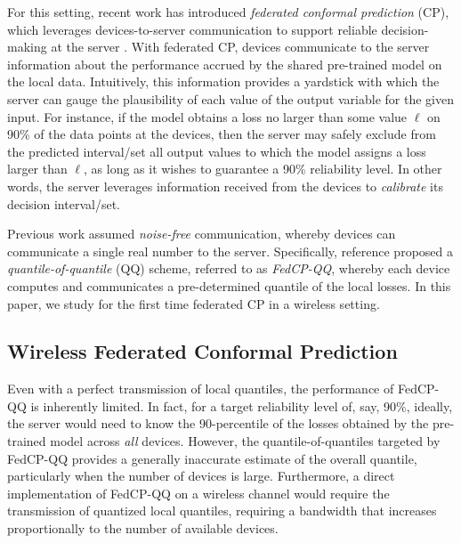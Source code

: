 \documentclass[12pt, draftclsnofoot, onecolumn]{IEEEtran}
\begin{document}
For this setting, recent work has introduced \emph{federated conformal prediction} (CP), which leverages devices-to-server communication to support reliable decision-making at the server \cite{FedCP-QQ}. With federated CP, devices communicate to the server information about the performance accrued by the shared pre-trained model on the local data. Intuitively, this information provides a yardstick with which the server can gauge the plausibility of each value of the output variable for the given input. For instance, if the model obtains a loss no larger than some value $\ell$ on 90\% of the data points at the devices, then the server may safely exclude from the predicted interval/set all output values to which the model assigns a loss larger than $\ell$, as long as it wishes to guarantee a 90\% reliability level. In other words, the server leverages information received from the devices to \emph{calibrate} its decision interval/set.

Previous work \cite{FedCP-QQ} assumed \emph{noise-free} communication, whereby devices can communicate a single real number to the server. Specifically, reference \cite{FedCP-QQ} proposed a \emph{quantile-of-quantile} (QQ) scheme, referred to as \emph{FedCP-QQ}, whereby each device computes and communicates a pre-determined quantile of the local losses. In this paper, we study for the first time federated CP in a wireless setting.

\subsection{Wireless Federated Conformal Prediction}

Even with a perfect transmission of local quantiles, the performance of FedCP-QQ is inherently limited. In fact, for a target reliability level of, say, 90\%, ideally, the server would need to know the 90-percentile of the losses obtained by the pre-trained model across \emph{all} devices. However, the quantile-of-quantiles targeted by FedCP-QQ provides a generally inaccurate estimate of the overall quantile, particularly when the number of devices is large. Furthermore, a direct implementation of  FedCP-QQ \cite{FedCP-QQ} on a wireless channel would require the transmission of quantized local quantiles, requiring a bandwidth that increases proportionally to the number of available devices.
\end{document}

